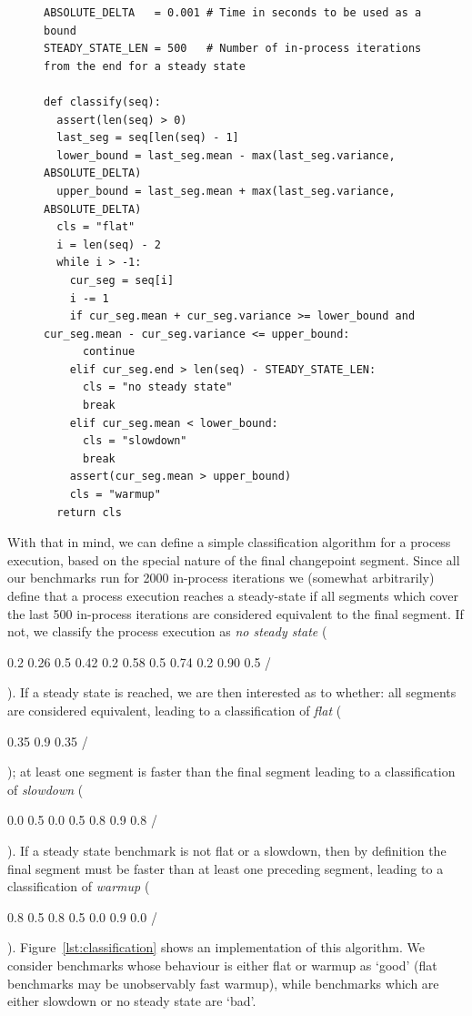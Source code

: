 \documentclass[acmlarge]{acmart}\settopmatter{printfolios=true}
\newcommand{\numiterations}{2000\xspace}
\DeclareRobustCommand{\flatc}{%
\setlength{\sparklinethickness}{0.4pt}%
\begin{sparkline}{1.5}
\spark 0.1 0.35
       0.9 0.35
       /%
\end{sparkline}\xspace%
}
\DeclareRobustCommand{\nosteadystate}{%
\setlength{\sparklinethickness}{0.4pt}%
\begin{sparkline}{1.5}
\spark 0.1 0.2
       0.26 0.5
       0.42 0.2
       0.58 0.5
       0.74 0.2
       0.90 0.5
       /%
\end{sparkline}\xspace%
}
\DeclareRobustCommand{\warmup}{%
\setlength{\sparklinethickness}{0.4pt}%
\begin{sparkline}{1.5}
\spark 0.1 0.8
       0.5 0.8
       0.5 0.0
       0.9 0.0
       /%
\end{sparkline}\xspace%
}
\DeclareRobustCommand{\slowdown}{%
\setlength{\sparklinethickness}{0.4pt}%
\begin{sparkline}{1.5}
\spark 0.1 0.0
       0.5 0.0
       0.5 0.8
       0.9 0.8
       /%
\end{sparkline}\xspace%
}
\begin{document}
\begin{figure}[t]
\begin{lstlisting}[label=lst:classification, xleftmargin=0cm, caption={The
classification algorithm for an individual process execution. Given an ordered
list of Segments -- each of which has "mean", "variance", and "end" attributes, the latter
its absolute ending position in the sequence of in-process iterations --
this function returns a string classifying the run sequence's warmup style.}]
ABSOLUTE_DELTA   = 0.001 # Time in seconds to be used as a bound
STEADY_STATE_LEN = 500   # Number of in-process iterations from the end for a steady state

def classify(seq):
  assert(len(seq) > 0)
  last_seg = seq[len(seq) - 1]
  lower_bound = last_seg.mean - max(last_seg.variance, ABSOLUTE_DELTA)
  upper_bound = last_seg.mean + max(last_seg.variance, ABSOLUTE_DELTA)
  cls = "flat"
  i = len(seq) - 2
  while i > -1:
    cur_seg = seq[i]
    i -= 1
    if cur_seg.mean + cur_seg.variance >= lower_bound and cur_seg.mean - cur_seg.variance <= upper_bound:
      continue
    elif cur_seg.end > len(seq) - STEADY_STATE_LEN:
      cls = "no steady state"
      break
    elif cur_seg.mean < lower_bound:
      cls = "slowdown"
      break
    assert(cur_seg.mean > upper_bound)
    cls = "warmup"
  return cls
\end{lstlisting}
\vspace{-.75cm}
\end{figure}

With that in mind, we can define a simple classification algorithm for a process
execution, based on the special nature of the final changepoint segment. Since all our benchmarks run
for \numiterations in-process iterations we (somewhat arbitrarily) define that a process
execution reaches a steady-state if all segments which cover the last 500
in-process iterations are considered equivalent to the final segment. If
not, we classify the process execution as \emph{no steady state} (\nosteadystate).
If a steady state is reached, we are then interested as to whether: all
segments are considered equivalent, leading to a classification of \emph{flat} (\flatc);
at least one segment is faster than the final segment leading to a classification
of \emph{slowdown} (\slowdown). If a steady state benchmark is not flat or a
slowdown, then by definition the final segment must be faster than
at least one preceding segment, leading to a classification of \emph{warmup} (\warmup).
Figure~\ref{lst:classification} shows an implementation of this algorithm.
We consider benchmarks whose behaviour is either flat or warmup
as `good' (flat benchmarks may be unobservably fast warmup), while
benchmarks which are either slowdown or no steady state are `bad'.
\end{document}
